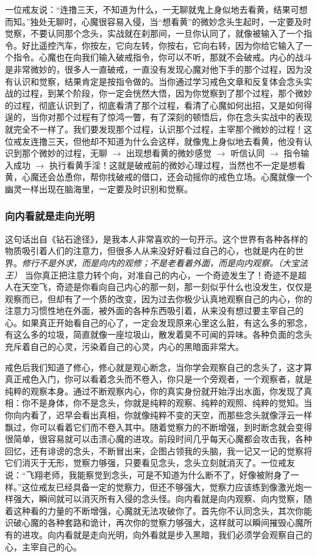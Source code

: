 一位戒友说：“连撸三天，不知道为什么，一无聊就鬼上身似地去看黄，结果可想而知。”独处无聊时，心魔很容易入侵，当“想看黄”的微妙念头生起时，一定要及时觉察，不要认同那个念头，实战就在刹那间，一旦你认同了，就像被输入了一个指令。好比遥控汽车，你按左，它向左转，你按右，它向右转，因为你给它输入了一个指令。心魔也在向我们输入破戒指令，你可以不听，那就不会破戒。内心的战斗是非常微妙的，很多人一直破戒，一直没有发现心魔对他下手的那个过程，因为没有认识和觉察，结果肯定是按指令做的。当你通过学习戒色文章和反复体会念头实战的过程，到某个阶段，你一定会恍然大悟，因为你觉察到了那个过程，那个微妙的过程，彻底认识到了，彻底看清了那个过程，看清了心魔如何出招，又是如何得逞的，当你对那个过程有了惊鸿一瞥，有了深刻的顿悟后，你在念头实战中的表现就完全不一样了。我们要发现那个过程，认识那个过程，主宰那个微妙的过程！这位戒友连撸三天，但他却不知道为什么会这样，就像鬼上身似地去看黄，他没有认识到那个微妙的过程，无聊 $\to$ 出现想看黄的微妙感觉 $\to$ 听信认同 $\to$ 指令输入成功 $\to$ 执行看黄手淫！这就是破戒前的微妙心理过程，当然也不一定是想看黄，心魔还会怂恿你，帮你找破戒的借口，还会动摇你的戒色立场。心魔就像一个幽灵一样出现在脑海里，一定要及时识别和觉察。

\subsubsection{向内看就是走向光明}

这句话出自《钻石途径》，是我本人非常喜欢的一句开示。这个世界有各种各样的物质吸引着人们的注意力，但很多人从来没好好看过自己的心，也就是内在的世界。\textit{修行不是外求，而是向内的观修；不是老看着外面，而是向内观察。（大宝法王）} 当你真正把注意力转个向，对准自己的内心，一个奇迹发生了！奇迹不是超人在天空飞，奇迹是你看向自己内心的那一刻，那一刻似乎什么也没发生，仅仅是观察而已，但却有了一个质的改变，因为过去你极少认真地观察自己的内心，你的注意力习惯性地在外面，被外面的各种东西吸引着，从来没有想过要主宰自己的心。如果真正开始看自己的心了，一定会发现原来心里这么脏，有这么多的邪念，有这么多的垃圾，简直就像一座垃圾山，散发着臭不可闻的异味。各种负面的念头充斥着自己的心灵，污染着自己的心灵，内心的黑暗面非常大。

戒色后我们知道了修心，修心就是观心断念，当你学会观察自己的念头了，这才算真正戒色入门，你可以看着念头而不卷入，你只是一个旁观者，一个观察者，就是纯粹的观察本身。通过不断观察内心，你的真实身份就开始浮出水面，你发现了真相：你不是身体，你不是念头，你就是纯粹的观察、纯粹的观照、纯粹的觉知。当你向内看了，迟早会看出真相，你就像纯粹不变的天空，而那些念头就像浮云一样飘过，你可以看着它们而不卷入其中。随着觉察力的不断增强，到时断念就会变得很简单，很容易就可以击溃心魔的进攻。前段时间几乎每天心魔都会攻击我，各种回忆，还有诽谤的念头，不断冒出来，企图占领我的头脑，我一记又一记的觉察将它们消灭于无形，觉察力够强，只要看见念头，念头立刻就消灭了。一位戒友说：“飞翔老师，我能察觉到念头，可是不知道为什么断不了，好像被附身了一样。”这位戒友已经具备一定的觉察力，但还不够强大，觉察力应该练到像激光炮一样强大，瞬间就可以消灭所有入侵的念头怪。向内看就是向内观察、向内觉察，随着这种看的力量的不断增强，心魔就无法攻破你了。首先你不认同念头，其次你能识破心魔的各种套路和诡计，再次你的觉察力够强大，这样就可以瞬间摧毁心魔所有的进攻。向内看就是走向光明，向外看就是步入黑暗，我们必须学会观察自己的心，主宰自己的心。

